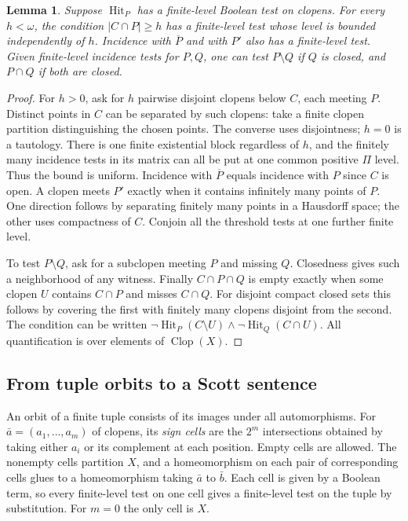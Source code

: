 \documentclass[11pt,letterpaper]{article}
\newtheorem{lemma}[theorem]{Lemma}
\theoremstyle{definition}\newtheorem{definition}[theorem]{Definition}
\newcommand{\Clop}{\operatorname{Clop}}
\newcommand{\Hit}{\operatorname{Hit}}
\newcommand{\card}[1]{\lvert #1\rvert}
\begin{document}
\begin{lemma}\label{lem:hit}
Suppose \(\Hit_P\) has a finite-level Boolean test on clopens.
For every \(h<\omega\), the condition \(\card{C\cap P}\ge h\) has a
finite-level test whose level is bounded independently of \(h\).
Incidence with \(\overline P\) and with \(P'\) also has a finite-level
test. Given finite-level incidence tests for \(P,Q\), one can test
\(P\setminus Q\) if \(Q\) is closed, and \(P\cap Q\) if both are closed.
\end{lemma}
\begin{proof}
For \(h>0\), ask for \(h\) pairwise disjoint clopens below \(C\), each
meeting \(P\). Distinct points in \(C\) can be separated by such clopens:
take a finite clopen partition distinguishing the chosen points. The
converse uses disjointness; \(h=0\) is a tautology. There is one finite
existential block regardless of \(h\), and the finitely many incidence
tests in its matrix can all be put at one common positive \(\Pi\) level.
Thus the bound is uniform. Incidence with \(\overline P\) equals incidence
with \(P\) since \(C\) is open. A clopen meets \(P'\) exactly when it
contains infinitely many points of \(P\). One direction follows by separating
finitely many points in a Hausdorff space; the other uses compactness of
\(C\). Conjoin all the threshold tests at one further finite level.

To test \(P\setminus Q\), ask for a subclopen meeting \(P\) and missing
\(Q\). Closedness gives such a neighborhood of any witness. Finally
\(C\cap P\cap Q\) is empty exactly when some clopen \(U\) contains
\(C\cap P\) and misses \(C\cap Q\). For disjoint compact closed sets this
follows by covering the first with finitely many clopens disjoint from
the second. The condition can be written
\(\neg\Hit_P(C\setminus U)\wedge\neg\Hit_Q(C\cap U)\).
All quantification is over elements of \(\Clop(X)\).
\end{proof}

\subsection*{From tuple orbits to a Scott sentence}
An orbit of a finite tuple consists of its images under all automorphisms.
For \(\bar a=(a_1,\dots,a_m)\) of clopens, its \emph{sign cells} are the
\(2^m\) intersections obtained by taking either \(a_i\) or its complement
at each position. Empty cells are allowed. The nonempty cells partition
\(X\), and a homeomorphism on each pair of corresponding cells glues to a
homeomorphism taking \(\bar a\) to \(\bar b\). Each cell is given by a
Boolean term, so every finite-level test on one cell gives a finite-level
test on the tuple by substitution. For \(m=0\) the only cell is \(X\).
\end{document}

